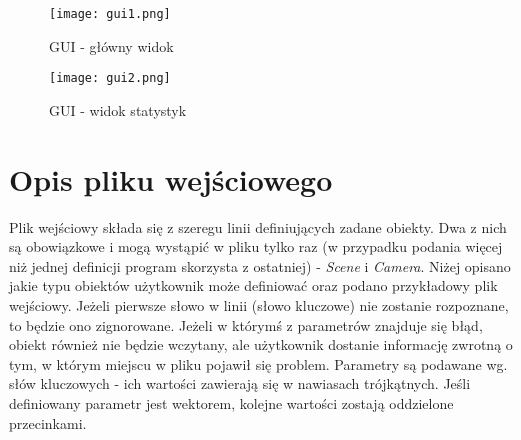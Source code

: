 \begin{figure}[htb!]
\centering
  \texttt{[image: gui1.png]}
  \caption{GUI - główny widok}
  \label{gui1}
\end{figure}

\begin{figure}[htb!]

\centering
  \texttt{[image: gui2.png]}
  \caption{GUI - widok statystyk}
  \label{gui2}
\end{figure}

\section{Opis pliku wejściowego}

Plik wejściowy składa się z szeregu linii definiujących zadane obiekty. Dwa z nich są obowiązkowe i mogą wystąpić w pliku tylko raz (w przypadku podania więcej niż jednej definicji program skorzysta z ostatniej) - \emph{Scene} i \emph{Camera}. Niżej opisano jakie typu obiektów użytkownik może definiować oraz podano przykładowy plik wejściowy. Jeżeli pierwsze słowo w linii (słowo kluczowe) nie zostanie rozpoznane, to będzie ono zignorowane. Jeżeli w którymś z parametrów znajduje się błąd, obiekt również nie będzie wczytany, ale użytkownik dostanie informację zwrotną o tym, w którym miejscu w pliku pojawił się problem. Parametry są podawane wg. słów kluczowych - ich wartości zawierają się w nawiasach trójkątnych. Jeśli definiowany parametr jest wektorem, kolejne wartości zostają oddzielone przecinkami.

